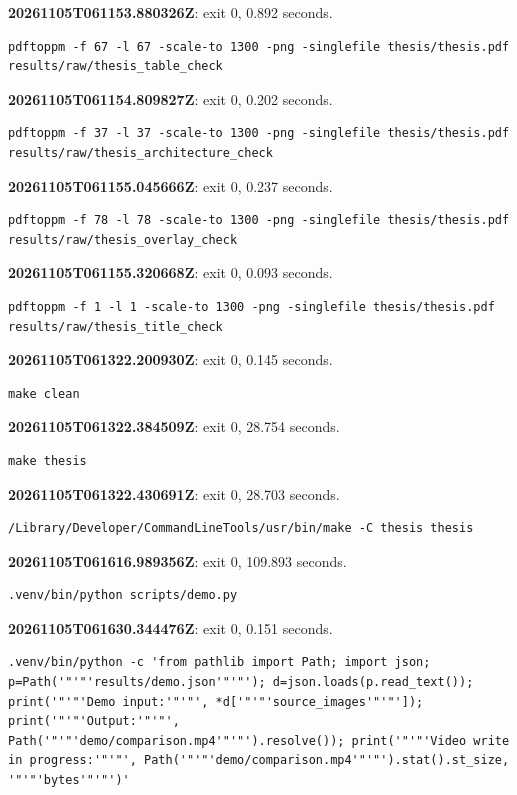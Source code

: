 \noindent\textbf{20261105T061153.880326Z}: exit 0, 0.892 seconds.
\begin{lstlisting}[numbers=none]
pdftoppm -f 67 -l 67 -scale-to 1300 -png -singlefile thesis/thesis.pdf results/raw/thesis_table_check
\end{lstlisting}

\noindent\textbf{20261105T061154.809827Z}: exit 0, 0.202 seconds.
\begin{lstlisting}[numbers=none]
pdftoppm -f 37 -l 37 -scale-to 1300 -png -singlefile thesis/thesis.pdf results/raw/thesis_architecture_check
\end{lstlisting}

\noindent\textbf{20261105T061155.045666Z}: exit 0, 0.237 seconds.
\begin{lstlisting}[numbers=none]
pdftoppm -f 78 -l 78 -scale-to 1300 -png -singlefile thesis/thesis.pdf results/raw/thesis_overlay_check
\end{lstlisting}

\noindent\textbf{20261105T061155.320668Z}: exit 0, 0.093 seconds.
\begin{lstlisting}[numbers=none]
pdftoppm -f 1 -l 1 -scale-to 1300 -png -singlefile thesis/thesis.pdf results/raw/thesis_title_check
\end{lstlisting}

\noindent\textbf{20261105T061322.200930Z}: exit 0, 0.145 seconds.
\begin{lstlisting}[numbers=none]
make clean
\end{lstlisting}

\noindent\textbf{20261105T061322.384509Z}: exit 0, 28.754 seconds.
\begin{lstlisting}[numbers=none]
make thesis
\end{lstlisting}

\noindent\textbf{20261105T061322.430691Z}: exit 0, 28.703 seconds.
\begin{lstlisting}[numbers=none]
/Library/Developer/CommandLineTools/usr/bin/make -C thesis thesis
\end{lstlisting}

\noindent\textbf{20261105T061616.989356Z}: exit 0, 109.893 seconds.
\begin{lstlisting}[numbers=none]
.venv/bin/python scripts/demo.py
\end{lstlisting}

\noindent\textbf{20261105T061630.344476Z}: exit 0, 0.151 seconds.
\begin{lstlisting}[numbers=none]
.venv/bin/python -c 'from pathlib import Path; import json; p=Path('"'"'results/demo.json'"'"'); d=json.loads(p.read_text()); print('"'"'Demo input:'"'"', *d['"'"'source_images'"'"']); print('"'"'Output:'"'"', Path('"'"'demo/comparison.mp4'"'"').resolve()); print('"'"'Video write in progress:'"'"', Path('"'"'demo/comparison.mp4'"'"').stat().st_size, '"'"'bytes'"'"')'
\end{lstlisting}

